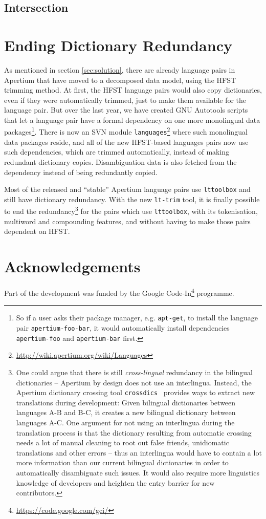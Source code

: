 \documentclass[10pt, a4paper]{article}
\newcommand{\tool}[1]{\texttt{#1}}
\begin{document}
\subsection{Intersection}


\section{Ending Dictionary Redundancy}

As mentioned in section \ref{sec:solution}, there are already language
pairs in Apertium that have moved to a decomposed data model, using
the HFST trimming method. At first, the HFST language pairs would also
copy dictionaries, even if they were automatically trimmed, just to
make them available for the language pair.  But over the last year, we
have created GNU Autotools scripts that let a language pair have a
formal dependency on one more monolingual data packages\footnote{So if
  a user asks their package manager, e.g. \tool{apt-get}, to install
  the language pair \tool{apertium-foo-bar}, it would automatically
  install dependencies \tool{apertium-foo} and \tool{apertium-bar}
  first.}. There is now an SVN module
\texttt{languages}\footnote{\href{http://wiki.apertium.org/wiki/Languages}{http://wiki.apertium.org/wiki/Languages}}
where such monolingual data packages reside, and all of the new
HFST-based languages pairs now use such dependencies, which are
trimmed automatically, instead of making redundant dictionary copies.
Disambiguation data is also fetched from the dependency instead of
being redundantly copied.

Most of the released and ``stable'' Apertium language pairs use
\tool{lttoolbox} and still have dictionary redundancy. With the new
\tool{lt-trim} tool, it is finally possible to end the
redundancy\footnote{One could argue that there is still
  \emph{cross-lingual} redundancy in the bilingual dictionaries --
  Apertium by design does not use an interlingua. Instead, the
  Apertium dictionary crossing tool
  \tool{crossdics}~\cite{toral2011crossdics-it-ca} provides ways to
  extract new translations during development: Given bilingual
  dictionaries between languages A-B and B-C, it creates a new
  bilingual dictionary between languages A-C. One argument for not
  using an interlingua during the translation process is that the
  dictionary resulting from automatic crossing needs a lot of manual
  cleaning to root out false friends, unidiomatic translations and
  other errors -- thus an interlingua would have to contain a lot more
  information than our current bilingual dictionaries in order to
  automatically disambiguate such issues. It would also require more
  linguistics knowledge of developers and heighten the entry barrier
  for new contributors.} for the pairs which use \tool{lttoolbox},
with its tokenisation, multiword and compounding features, and without
having to make those pairs dependent on HFST.



\section*{Acknowledgements}
Part of the development was funded by the Google
Code-In\footnote{\href{https://code.google.com/gci/}{https://code.google.com/gci/}} programme.



\end{document}
